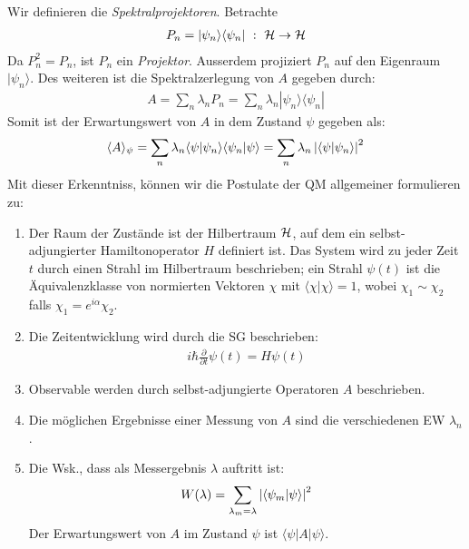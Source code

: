 Wir definieren die \textit{Spektralprojektoren}. Betrachte
\begin{align*}
    P_n = | \psi_n \rangle \langle \psi_n | \ : \ \mathcal{H} \rightarrow \mathcal{H}
\end{align*}
Da $P_n^2 = P_n$, ist $P_n$ ein \textit{Projektor}. Ausserdem projiziert
$P_n$ auf den Eigenraum $| \psi_n \rangle$. Des weiteren ist die
Spektralzerlegung von $A$ gegeben durch:
\begin{align*}
    A = \sum_n \lambda_n P_n = \sum_n \lambda_n | \psi_n \rangle \langle \psi_n |
\end{align*}
Somit ist der Erwartungswert von $A$ in dem Zustand $\psi$ gegeben als:
\begin{align*}
    \langle A \rangle_{\psi}
    = \sum_n \lambda_n \langle \psi | \psi_n \rangle \langle \psi_n | \psi \rangle
    = \sum_n \lambda_n \left\vert \langle \psi | \psi_n \rangle \right\vert^2
\end{align*}
Mit dieser Erkenntniss, können wir die Postulate der QM allgemeiner formulieren zu:
\begin{enumerate}[(i')]
    \item Der Raum der Zustände ist der Hilbertraum $\mathcal{H}$, auf dem ein selbst-adjungierter
        Hamiltonoperator $H$ definiert ist. Das System wird zu jeder Zeit $t$ durch
        einen Strahl im Hilbertraum beschrieben; ein Strahl $\psi(t)$ ist die
        Äquivalenzklasse von normierten Vektoren $\chi$ mit $\langle \chi | \chi
        \rangle = 1$, wobei $\chi_1 \sim \chi_2$ falls $\chi_1 = e^{i \alpha} \chi_2$.
    \item Die Zeitentwicklung wird durch die SG beschrieben:
        \begin{align*}
            i \hbar \frac{\partial}{\partial t} \psi(t) = H \psi(t)
        \end{align*}
    \item Observable werden durch selbst-adjungierte Operatoren $A$ beschrieben.
    \item Die möglichen Ergebnisse einer Messung von $A$ sind die verschiedenen
        EW $\lambda_n$.
    \item Die Wsk., dass als Messergebnis $\lambda$ auftritt ist:
        \begin{align*}
            W(\lambda) = \sum_{\lambda_m = \lambda} \left\vert \langle \psi_m | \psi \rangle \right\vert^2
        \end{align*}
        Der Erwartungswert von $A$ im Zustand $\psi$ ist $\langle \psi | A | \psi \rangle$.
\end{enumerate}

